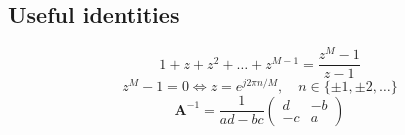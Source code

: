 \documentclass[english]{latex4ei/latex4ei_sheet}
\begin{document}
\begin{sectionbox}
  \subsection{Useful identities}
  $$1+z+z^2+\dots+z^{M-1} = \frac{z^M - 1}{z-1}$$
  $$z^M - 1 = 0\Leftrightarrow z = e^{j2\pi n / M}, \quad n\in\{\pm1,\pm2,\dots\}$$
  $$\boldsymbol{A}^{-1}=\frac{1}{a d-b c}\left(\begin{array}{cc}
    d & -b \\
    -c & a
    \end{array}\right)$$
\end{sectionbox}
\end{document}
